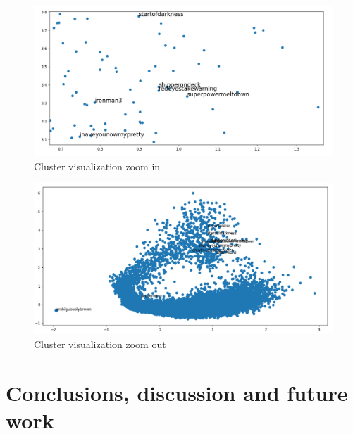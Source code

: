 \documentclass[letterpaper]{article}
\begin{document}
	\begin{figure}
	\centering
	\includegraphics[width=1\linewidth]{../images/cluster-36-visualization-new-corpus-v3-1024-ironman3-font-16-zoom-in.png}
	\caption{Cluster visualization zoom in}
	\label{fig:cluster-visualization-zoom-in}
	\end{figure}
	
	
	\begin{figure}
	\centering
	\includegraphics[width=1\linewidth]{../images/cluster-36-visualization-new-corpus-v3-1024-ironman3-zoom-out.png}
	\caption{Cluster visualization zoom out}
	\label{fig:cluster-visualization-zoom-out}
	\end{figure}
	
	
	
	\section{Conclusions, discussion and future work}
	
\end{document}
